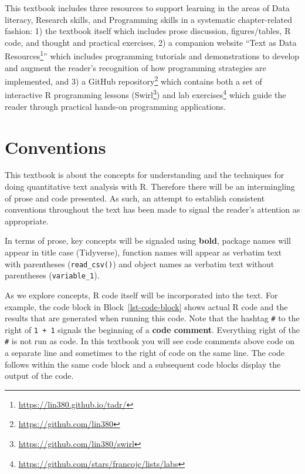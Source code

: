 \documentclass[
  letterpaper,
]{scrbook}
\DeclareRobustCommand{\href}[2]{#2\footnote{\url{#1}}}
\begin{document}

This textbook includes three resources to support learning in the areas
of Data literacy, Research skills, and Programming skills in a
systematic chapter-related fashion: 1) the textbook itself which
includes prose discussion, figures/tables, R code, and thought and
practical exercises, 2) a companion website
``\href{https://lin380.github.io/tadr/}{Text as Data Resources}'' which
includes programming tutorials and demonstrations to develop and augment
the reader's recognition of how programming strategies are implemented,
and 3) a \href{https://github.com/lin380}{GitHub repository} which
contains both a set of interactive R programming lessons
(\href{https://github.com/lin380/swirl}{Swirl}) and
\href{https://github.com/stars/francojc/lists/labs}{lab exercises} which
guide the reader through practical hands-on programming applications.

\hypertarget{conventions}{%
\section*{Conventions}\label{conventions}}


This textbook is about the concepts for understanding and the techniques
for doing quantitative text analysis with R. Therefore there will be an
intermingling of prose and code presented. As such, an attempt to
establish consistent conventions throughout the text has been made to
signal the reader's attention as appropriate.

In terms of prose, key concepts will be signaled using \textbf{bold},
package names will appear in title case (Tidyverse), function names will
appear as verbatim text with parentheses (\texttt{read\_csv()}) and
object names as verbatim text without parentheses
(\texttt{variable\_1}).

As we explore concepts, R code itself will be incorporated into the
text. For example, the code block in Block~\ref{lst-code-block} shows
actual R code and the results that are generated when running this code.
Note that the hashtag \texttt{\#} to the right of \texttt{1\ +\ 1}
signals the beginning of a \textbf{code comment}. Everything right of
the \texttt{\#} is not run as code. In this textbook you will see code
comments above code on a separate line and sometimes to the right of
code on the same line. The code follows within the same code block and a
subsequent code blocks display the output of the code.
\end{document}
